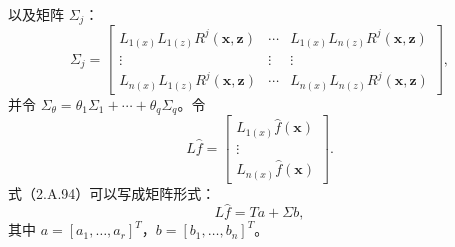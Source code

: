 以及矩阵 $\Sigma_j$：
\[
\Sigma_j=\begin{bmatrix}
L_{1(x)}L_{1(z)}R^j(\boldsymbol x,\boldsymbol z)&\cdots&
 L_{1(x)}L_{n(z)}R^j(\boldsymbol x,\boldsymbol z)\\
\vdots&\vdots&\vdots\\
L_{n(x)}L_{1(z)}R^j(\boldsymbol x,\boldsymbol z)&\cdots&
 L_{n(x)}L_{n(z)}R^j(\boldsymbol x,\boldsymbol z)
\end{bmatrix},
\]
并令 $\Sigma_\theta=\theta_1\Sigma_1+\cdots+\theta_q\Sigma_q$。令
\[
L\widehat f=\begin{bmatrix}
L_{1(x)}\widehat f(\boldsymbol x)\\\vdots\\L_{n(x)}\widehat f(\boldsymbol x)
\end{bmatrix}.
\]
式（2.A.94）可以写成矩阵形式：
\begin{equation}
L\widehat f=Ta+\Sigma b,\tag{2.A.96}
\end{equation}
其中 $a=[a_1,\ldots,a_r]^T$，$b=[b_1,\ldots,b_n]^T$。

